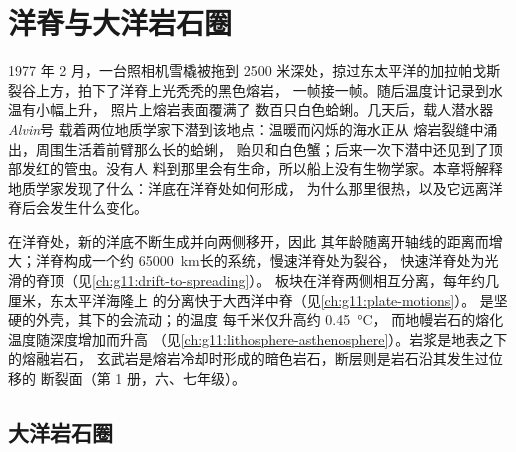 \chapter{洋脊与大洋岩石圈}\label{ch:g11:ocean-ridges}

1977 年 2 月，一台照相机雪橇被拖到 2500 米深处，掠过东太平洋的加拉帕戈斯
裂谷上方，拍下了洋脊上光秃秃的黑色熔岩，
一帧接一帧。随后温度计记录到水温有小幅上升，
照片上熔岩表面覆满了
数百只白色蛤蜊。几天后，载人潜水器\emph{Alvin}号
载着两位地质学家下潜到该地点：温暖而闪烁的海水正从
熔岩裂缝中涌出，周围生活着前臂那么长的蛤蜊，
贻贝和白色蟹；后来一次下潜中还见到了顶部发红的管虫。没有人
料到那里会有生命，所以船上没有生物学家。本章将解释
地质学家发现了什么：洋底在洋脊处如何形成，
为什么那里很热，以及它远离洋脊后会发生什么变化。

\begin{recall}
在洋脊处，新的洋底不断生成并向两侧移开，因此
其年龄随离开轴线的距离而增大；洋脊构成一个约
\qty{65000}{km}长的系统，慢速洋脊处为裂谷，
快速洋脊处为光滑的脊顶（见\cref{ch:g11:drift-to-spreading}）。
板块在洋脊两侧相互分离，每年约几厘米，东太平洋海隆上
的分离快于大西洋中脊（见\cref{ch:g11:plate-motions}）。
是坚硬的外壳，其下的会流动；的温度
每千米仅升高约 \qty{0.45}{\celsius}，
而地幔岩石的熔化温度随深度增加而升高
（见\cref{ch:g11:lithosphere-asthenosphere}）。岩浆是地表之下的熔融岩石，
玄武岩是熔岩冷却时形成的暗色岩石，断层则是岩石沿其发生过位移的
断裂面（第 1 册，六、七年级）。
\end{recall}

\section{大洋岩石圈}

